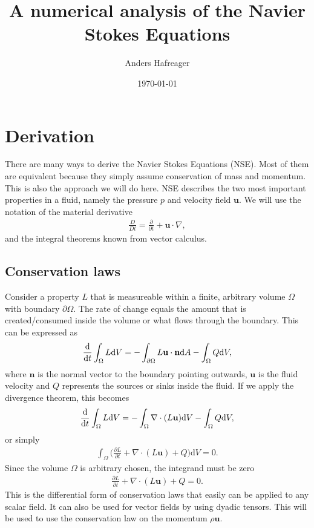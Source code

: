 \documentclass[a4paper,10pt]{article}
\title{A numerical analysis of the Navier Stokes Equations}
\date{\today}
\author{Anders Hafreager}
\renewcommand{\vec}[1]{\mathbf{#1}}
\renewcommand{\(}{\left(}
\renewcommand{\)}{\right)}
\newcommand{\dm}[1]{\text{d}#1}
\newcommand{\dpart}[2]{\frac{\partial#1}{\partial#2}}
\begin{document}
\maketitle
\section{Derivation}
There are many ways to derive the Navier Stokes Equations (NSE). Most of them are equivalent because they simply assume conservation of mass and momentum. This is also the approach we will do here. NSE describes the two most important properties in a fluid, namely the pressure $p$ and velocity field $\vec u$. We will use the notation of the material derivative 
\begin{align*}
  \frac{D}{Dt} = \dpart{}{t} + \vec u \cdot \nabla,
\end{align*}
and the integral theorems known from vector calculus.

\subsection{Conservation laws}
Consider a property $L$ that is measureable within a finite, arbitrary volume $\Omega$ with boundary $\partial \Omega$. The rate of change equals the amount that is created/consumed inside the volume or what flows through the boundary. This can be expressed as
\begin{align*}
  \frac{\dm }{\dm t} \int_\Omega L \dm V = -\int_{\partial \Omega} L\vec u \cdot \vec n \dm A - \int_\Omega Q \dm V,
\end{align*}
where $\vec n$ is the normal vector to the boundary pointing outwards, $\vec u$ is the fluid velocity and $Q$ represents the sources or sinks inside the fluid. If we apply the divergence theorem, this becomes
\begin{align*}
  \frac{\dm }{\dm t} \int_\Omega L \dm V = -\int_{\Omega} \nabla \cdot (L\vec u) \dm V - \int_\Omega Q \dm V,
\end{align*}
or simply
\begin{align*}
\int_\Omega \Bigg(\dpart{L}{t} + \nabla \cdot (L\vec u) + Q \Bigg)\dm V = 0.
\end{align*}
Since the volume $\Omega$ is arbitrary chosen, the integrand must be zero
\begin{align}
  \label{eq:conservation_law}
  \dpart{L}{t} + \nabla \cdot (L\vec u) + Q = 0.
\end{align}
This is the differential form of conservation laws that easily can be applied to any scalar field. It can also be used for vector fields by using dyadic tensors. This will be used to use the conservation law on the momentum $\rho \vec u$.
\end{document}
